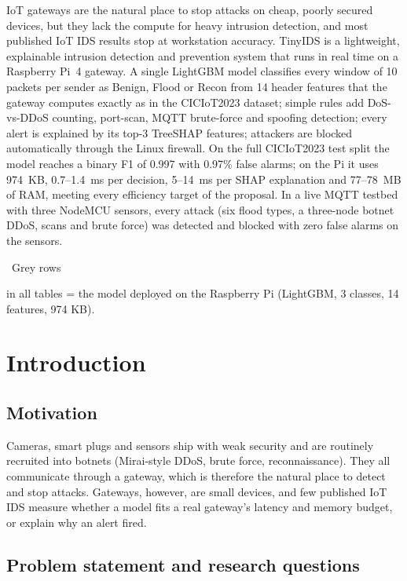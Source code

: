 \documentclass[11pt,a4paper]{article}
\begin{document}
IoT gateways are the natural place to stop attacks on cheap, poorly secured devices, but they lack the compute for
heavy intrusion detection, and most published IoT IDS results stop at workstation accuracy. TinyIDS is a
lightweight, explainable intrusion detection and prevention system that runs in real time on a Raspberry Pi~4
gateway. A single LightGBM model classifies every window of 10 packets per sender as Benign, Flood or Recon from
14 header features that the gateway computes exactly as in the CICIoT2023 dataset; simple rules add DoS-vs-DDoS
counting, port-scan, MQTT brute-force and spoofing detection; every alert is explained by its top-3 TreeSHAP
features; attackers are blocked automatically through the Linux firewall. On the full CICIoT2023 test split the
model reaches a binary F1 of 0.997 with 0.97\% false alarms; on the Pi it uses 974~KB, 0.7--1.4~ms per decision,
5--14~ms per SHAP explanation and 77--78~MB of RAM, meeting every efficiency target of the proposal. In a live
MQTT testbed with three NodeMCU sensors, every attack (six flood types, a three-node botnet DDoS, scans and
brute force) was detected and blocked with zero false alarms on the sensors.

\tableofcontents
\vspace{0.6em}
\noindent\colorbox{gray!18}{\strut\ Grey rows\ } in all tables = the model deployed on the Raspberry Pi
(LightGBM, 3 classes, 14 features, 974 KB).

\newpage
\section{Introduction}

\subsection{Motivation}

Cameras, smart plugs and sensors ship with weak security and are routinely recruited into botnets (Mirai-style
DDoS, brute force, reconnaissance). They all communicate through a gateway, which is therefore the natural place to
detect and stop attacks. Gateways, however, are small devices, and few published IoT IDS measure whether a model
fits a real gateway's latency and memory budget, or explain why an alert fired.

\subsection{Problem statement and research questions}
\end{document}
